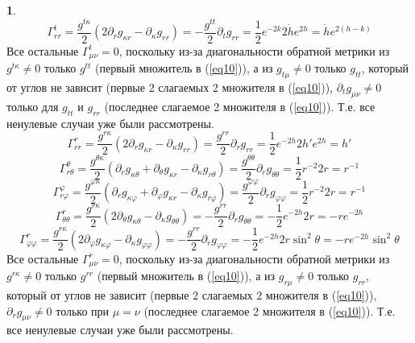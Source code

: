 \documentclass[12pt]{article}
\theoremstyle{definition}
\newtheorem{zad}{}[section]
\begin{document}
\begin{zad}
\begin{equation}
    \Gamma^t_{rr}=\frac{g^{t\kappa}}{2}(2\partial_rg_{\kappa r}-\partial_\kappa g_{rr})=-\frac{g^{tt}}{2}\partial_tg_{rr}=\frac{1}{2}e^{-2k}2\dot{h}e^{2h}=\dot{h}e^{2(h-k)}
\end{equation}
Все остальные $\Gamma^t_{\mu\nu}=0$, поскольку из-за диагональности обратной метрики из $g^{t\kappa}\neq0$ только $g^{tt}$ (первый множитель в (\ref{eq10})), а из $g_{t\mu}\neq0$ только $g_{tt}$, который от углов не зависит (первые 2 слагаемых 2 множителя в (\ref{eq10})), $\partial_tg_{\mu\nu}\neq0$ только для $g_{tt}$ и $g_{rr}$ (последнее слагаемое 2 множителя в (\ref{eq10})). Т.е. все ненулевые случаи уже были рассмотрены.
\begin{equation}
    \Gamma^r_{rr}=\frac{g^{r\kappa}}{2}(2\partial_rg_{\kappa r}-\partial_\kappa g_{rr})=\frac{g^{rr}}{2}\partial_rg_{rr}=\frac{1}{2}e^{-2h}2h'e^{2h}=h'
\end{equation}
\begin{equation}
    \Gamma^\theta_{r\theta}=\frac{g^{\theta\kappa}}{2}(\partial_r g_{\kappa\theta}+\partial_\theta g_{\kappa r}-\partial_\kappa g_{r\theta})=\frac{g^{\theta\theta}}{2}\partial_rg_{\theta\theta}=\frac{1}{2}r^{-2}2r=r^{-1}
\end{equation}
\begin{equation}
    \Gamma^\varphi_{r\varphi}=\frac{g^{\varphi\kappa}}{2}(\partial_r g_{\kappa\varphi}+\partial_\varphi g_{\kappa r}-\partial_\kappa g_{r\varphi})=\frac{g^{\varphi\varphi}}{2}\partial_rg_{\varphi\varphi}=\frac{1}{2}r^{-2}2r=r^{-1}
\end{equation}
\begin{equation}
    \Gamma^r_{\theta\theta}=\frac{g^{r\kappa}}{2}(2\partial_\theta g_{\kappa\theta}-\partial_\kappa g_{\theta\theta})=-\frac{g^{rr}}{2}\partial_rg_{\theta\theta}=-\frac{1}{2}e^{-2h}2r=-re^{-2h}
\end{equation}
\begin{equation}
    \Gamma^r_{\varphi\varphi}=\frac{g^{r\kappa}}{2}(2\partial_\varphi g_{\kappa\varphi}-\partial_\kappa g_{\varphi\varphi})=-\frac{g^{rr}}{2}\partial_rg_{\varphi\varphi}=-\frac{1}{2}e^{-2h}2r\sin^2\theta=-re^{-2h}\sin^2\theta
\end{equation}
Все остальные $\Gamma^r_{\mu\nu}=0$, поскольку из-за диагональности обратной метрики из $g^{r\kappa}\neq0$ только $g^{rr}$ (первый множитель в (\ref{eq10})), а из $g_{r\mu}\neq0$ только $g_{rr}$, который от углов не зависит (первые 2 слагаемых 2 множителя в (\ref{eq10})), $\partial_rg_{\mu\nu}\neq0$ только при $\mu=\nu$ (последнее слагаемое 2 множителя в (\ref{eq10})). Т.е. все ненулевые случаи уже были рассмотрены.

\end{zad}
\end{document}
